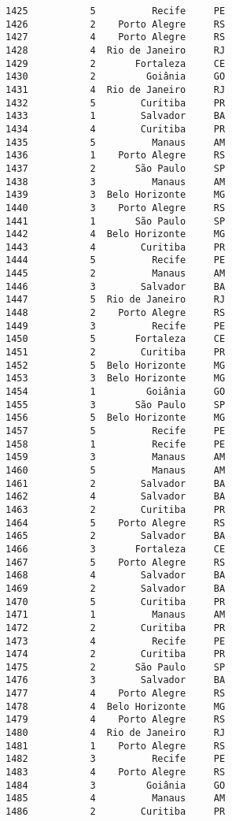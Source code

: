 \documentclass[11pt]{article}
\begin{document}
\begin{Verbatim}[commandchars=\\\{\}]
1425           5          Recife     PE  
1426           2    Porto Alegre     RS  
1427           4    Porto Alegre     RS  
1428           4  Rio de Janeiro     RJ  
1429           2       Fortaleza     CE  
1430           2         Goiânia     GO  
1431           4  Rio de Janeiro     RJ  
1432           5        Curitiba     PR  
1433           1        Salvador     BA  
1434           4        Curitiba     PR  
1435           5          Manaus     AM  
1436           1    Porto Alegre     RS  
1437           2       São Paulo     SP  
1438           3          Manaus     AM  
1439           3  Belo Horizonte     MG  
1440           3    Porto Alegre     RS  
1441           1       São Paulo     SP  
1442           4  Belo Horizonte     MG  
1443           4        Curitiba     PR  
1444           5          Recife     PE  
1445           2          Manaus     AM  
1446           3        Salvador     BA  
1447           5  Rio de Janeiro     RJ  
1448           2    Porto Alegre     RS  
1449           3          Recife     PE  
1450           5       Fortaleza     CE  
1451           2        Curitiba     PR  
1452           5  Belo Horizonte     MG  
1453           3  Belo Horizonte     MG  
1454           1         Goiânia     GO  
1455           3       São Paulo     SP  
1456           5  Belo Horizonte     MG  
1457           5          Recife     PE  
1458           1          Recife     PE  
1459           3          Manaus     AM  
1460           5          Manaus     AM  
1461           2        Salvador     BA  
1462           4        Salvador     BA  
1463           2        Curitiba     PR  
1464           5    Porto Alegre     RS  
1465           2        Salvador     BA  
1466           3       Fortaleza     CE  
1467           5    Porto Alegre     RS  
1468           4        Salvador     BA  
1469           2        Salvador     BA  
1470           5        Curitiba     PR  
1471           1          Manaus     AM  
1472           2        Curitiba     PR  
1473           4          Recife     PE  
1474           2        Curitiba     PR  
1475           2       São Paulo     SP  
1476           3        Salvador     BA  
1477           4    Porto Alegre     RS  
1478           4  Belo Horizonte     MG  
1479           4    Porto Alegre     RS  
1480           4  Rio de Janeiro     RJ  
1481           1    Porto Alegre     RS  
1482           3          Recife     PE  
1483           4    Porto Alegre     RS  
1484           3         Goiânia     GO  
1485           4          Manaus     AM  
1486           2        Curitiba     PR  

\end{Verbatim}
\end{document}
